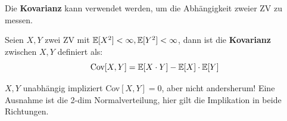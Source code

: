 
Die \textbf{Kovarianz} kann verwendet werden, um die Abhängigkeit zweier ZV zu messen.

\begin{tcolorbox}
    Seien $X, Y$ zwei ZV mit $\mathbb{E}[X^2] < \infty, \mathbb{E}[Y^2] < \infty$, dann ist die \textbf{Kovarianz} zwischen $X, Y$ definiert als:
    $$\text{Cov}[X,Y] = \mathbb{E}[X \cdot Y] - \mathbb{E}[X] \cdot \mathbb{E}[Y]$$
\end{tcolorbox}

$X,Y$ unabhängig impliziert Cov$[X,Y] = 0$, aber nicht andersherum! Eine Ausnahme ist die 2-dim Normalverteilung, hier gilt die Implikation in beide Richtungen.
